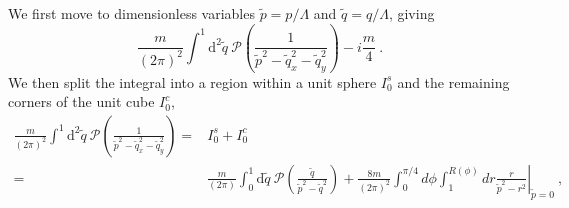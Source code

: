 %
%  
We first move to dimensionless variables $\tilde p=p/\Lambda$ and $\tilde q= q/\Lambda$, giving
 \begin{equation}
 \frac{m}{(2 \pi)^2} \int^{1} \mathrm{d}^2\tilde q\ \mathcal{P}\left(\frac{1}{\tilde p^2-\tilde q_x^{2}-\tilde q_y^{2}}\right)-i \frac{m}{4} \ .
 \end{equation}
We then split the integral into a region within a unit sphere $I_0^s$ and the remaining corners of the unit cube $I_0^c$,
 \begin{align}
 \frac{m}{(2 \pi)^2} \int^{1} \mathrm{d}^2\tilde q\ \mathcal{P}\left(\frac{1}{\tilde p^2-\tilde q_x^{2}-\tilde q_y^{2}}\right)=&I_0^s+I_0^c\\
 =&\frac{m}{(2 \pi)} \int^{1}_0 \mathrm{d}\tilde q\ \mathcal{P}\left(\frac{\tilde q}{\tilde p^2-\tilde q^{2}}\right)+\left.\frac{8m}{(2\pi)^2}\int_0^{\pi/4}d\phi\int_1^{R(\phi)}dr\frac{r}{\tilde p^2-r^2}\right|_{\tilde p=0}\ ,
 \end{align}
